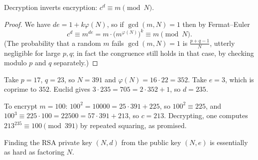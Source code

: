 \documentclass[a4paper]{scrartcl}
\begin{document}
\begin{center}
\end{center}

\begin{proposition}
	Decryption inverts encryption: $c^d \equiv m\pmod N$.
\end{proposition}

\begin{proof}
	We have $de = 1+k\varphi(N)$, so if $\gcd(m,N)=1$ then by Fermat--Euler
	$$c^d \equiv m^{de} = m\cdot\bigl(m^{\varphi(N)}\bigr)^k\equiv m\pmod N.$$
	(The probability that a random $m$ fails $\gcd(m,N)=1$ is $\frac{p+q-1}{N}$, utterly negligible for large $p,q$; in fact the congruence still holds in that case, by checking modulo $p$ and $q$ separately.)
\end{proof}

\begin{example}
	Take $p = 17$, $q = 23$, so $N = 391$ and $\varphi(N) = 16\cdot22 = 352$. Take $e = 3$, which is coprime to $352$. Euclid gives $3\cdot235 = 705 = 2\cdot352+1$, so $d = 235$.

	To encrypt $m = 100$: $100^2 = 10000 = 25\cdot391+225$, so $100^2\equiv225$, and $100^3\equiv225\cdot100 = 22500 = 57\cdot391+213$, so $c = 213$. Decrypting, one computes $213^{235}\equiv100\pmod{391}$ by repeated squaring, as promised.
\end{example}

\begin{corollary}\label{cor:rsahard}
	Finding the RSA private key $(N,d)$ from the public key $(N,e)$ is essentially as hard as factoring $N$.
\end{corollary}
\end{document}

